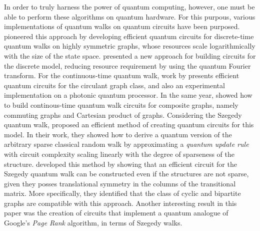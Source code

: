 \documentclass[../../dissertation.tex]{subfiles}
\begin{document}
In order to truly harness the power of quantum computing, however, one must be
able to perform these algorithms on quantum hardware. For this purpous, various
implementations of quantum walks on quantum circuits have been purposed.
\cite{douglaswang07} pioneered this approach by developing
efficient quantum circuits for discrete-time quantum walks on highly symmetric
graphs, whose resources scale logarithmically with the size of the state space.
\cite{shakeel2020} presented a new approach for building circuits for the
discrete model, reducing resource requirement by using the quantum Fourier
transform. 
For the continuous-time quantum walk, work by \cite{qiang2016} presents
efficient quantum circuits for the circulant graph class, and also an
experimental implementation on a photonic quantum processor. In the same year,
\cite{loke2017b} showed how to build continous-time quantum walk circuits for
composite graphs, namely commuting graphs and Cartesian product of graphs.
Considering the Szegedy quantum walk, \cite{chiang2009} proposed an efficient
method of creating quantum circuits for this model.  In their work, they showed
how to derive a quantum version of the arbitrary sparse classical random walk
by approximating a \textit{quantum update rule} with circuit complexity scaling
linearly with the degree of sparseness of the structure. \cite{loke2017a}
developed this method by showing that an efficient circuit for the Szegedy
quantum walk can be constructed even if the structures are not sparse, given
they posses translational symmetry in the columns of the transitional matrix.
More specifically, they identified that the class of cyclic and bipartite
graphs are compatible with this approach.  Another interesting result in this
paper was the creation of circuits that implement a quantum analogue of
Google's \textit{Page Rank} algorithm, in terms of Szegedy walks. \par
\end{document}
